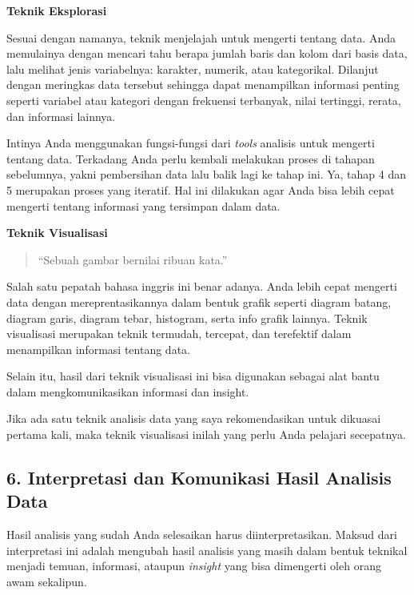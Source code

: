 \documentclass[openany]{book}
\begin{document}
\textbf{Teknik Eksplorasi}

Sesuai dengan namanya, teknik menjelajah untuk mengerti tentang data.
Anda memulainya dengan mencari tahu berapa jumlah baris dan kolom dari
basis data, lalu melihat jenis variabelnya: karakter, numerik, atau
kategorikal. Dilanjut dengan meringkas data tersebut sehingga dapat
menampilkan informasi penting seperti variabel atau kategori dengan
frekuensi terbanyak, nilai tertinggi, rerata, dan informasi lainnya.

Intinya Anda menggunakan fungsi-fungsi dari \emph{tools} analisis untuk
mengerti tentang data. Terkadang Anda perlu kembali melakukan proses di
tahapan sebelumnya, yakni pembersihan data lalu balik lagi ke tahap ini.
Ya, tahap 4 dan 5 merupakan proses yang iteratif. Hal ini dilakukan agar
Anda bisa lebih cepat mengerti tentang informasi yang tersimpan dalam
data.

\textbf{Teknik Visualisasi}

\begin{quote}
``Sebuah gambar bernilai ribuan kata.''
\end{quote}

Salah satu pepatah bahasa inggris ini benar adanya. Anda lebih cepat
mengerti data dengan mereprentasikannya dalam bentuk grafik seperti
diagram batang, diagram garis, diagram tebar, histogram, serta info
grafik lainnya. Teknik visualisasi merupakan teknik termudah, tercepat,
dan terefektif dalam menampilkan informasi tentang data.

Selain itu, hasil dari teknik visualisasi ini bisa digunakan sebagai
alat bantu dalam mengkomunikasikan informasi dan insight.

Jika ada satu teknik analisis data yang saya rekomendasikan untuk
dikuasai pertama kali, maka teknik visualisasi inilah yang perlu Anda
pelajari secepatnya.

\subsection*{6. Interpretasi dan Komunikasi Hasil Analisis
Data}\label{interpretasi-dan-komunikasi-hasil-analisis-data}

Hasil analisis yang sudah Anda selesaikan harus diinterpretasikan.
Maksud dari interpretasi ini adalah mengubah hasil analisis yang masih
dalam bentuk teknikal menjadi temuan, informasi, ataupun \emph{insight}
yang bisa dimengerti oleh orang awam sekalipun.
\end{document}

